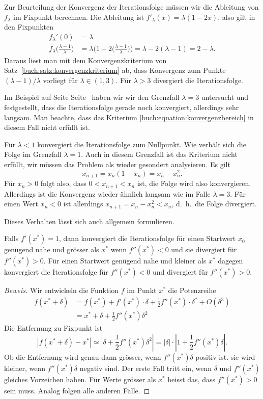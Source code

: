 Zur Beurteilung der Konvergenz der Iterationsfolge müssen wir die Ableitung
von $f_\lambda$ im Fixpunkt berechnen.
Die Ableitung ist $f'_\lambda(x)=\lambda (1-2x)$, also gilt in den Fixpunkten
\begin{align*}
f_\lambda'(0)
&=
\lambda
\\
f_\lambda\biggl(\frac{\lambda-1}{\lambda}\biggr)
&=
\lambda\biggl( 1-2
\biggl(\frac{\lambda-1}{\lambda}\biggr)\biggr)
=
\lambda-2(\lambda-1)
=
2-\lambda.
\end{align*}
Daraus liest man mit dem Konvergenzkriterium von
Satz~\ref{buch:satz:konvergenzkriterium} ab, dass Konvergenz zum Punkte
$(\lambda-1)/\lambda$ vorliegt für $\lambda \in (1,3)$.
Für $\lambda>3$ divergiert die Iterationsfolge.

Im Beispiel auf Seite Seite~\pageref{buch:beispiel:logistisch3} haben wir
wir den Grenzfall $\lambda=3$ untersucht und festgestellt, dass die
Iterationsfolge gerade noch konvergiert, allerdings sehr langsam.
Man beachte, dass das Kriterium \eqref{buch:equation:konvergenzbereich}
in diesem Fall nicht erfüllt ist.

Für $\lambda<1$ konvergiert die Iterationsfolge zum Nullpunkt.
Wie verhält sich die Folge im Grenzfall $\lambda=1$.
Auch in diesem Grenzfall ist das Kriterium nicht erfüllt, wir müssen
das Problem als wieder gesondert analysieren.
Es gilt
\[
x_{n+1} = x_n(1-x_n) = x_n-x_n^2.
\]
Für $x_n>0$ folgt also, dass $0<x_{n+1} < x_n$ ist, die Folge wird also
konvergieren.
Allerdings ist die Konvergenz wieder ähnlich langsam wie im Falle
$\lambda=3$.
Für einen Wert $x_n<0$ ist allerdings $x_{n+1} = x_n - x_n^2 < x_n$,
d.~h.~die Folge divergiert.

Dieses Verhalten lässt sich auch allgemein formulieren.

\begin{satz}
\label{buch:satz:kritischekonvergenz}
Falls $f'(x^*)=1$, dann konvergiert die Iterationsfolge für einen
Startwert $x_0$ genügend nahe und grösser als $x^*$ wenn $f''(x^*)<0$ 
und sie divergiert für $f''(x^*)>0$.
Für einen Startwert genügend nahe und kleiner als $x^*$ dagegen
konvergiert die Iterationsfolge für $f''(x^*)<0$ und divergiert für
$f''(x^*)>0$.
\end{satz}

\begin{proof}[Beweis]
Wir entwickeln die Funktion $f$ im Punkt $x^*$ die Potenzreihe
\begin{align*}
f(x^*+\delta)
&=
f(x^*) + f'(x^*)\cdot\delta + \frac12f''(x^*)\cdot \delta^* + O(\delta^3)
\\
&=
x^* + \delta + \frac12f''(x^*)\delta^2
\end{align*}
Die Entfernung zu Fixpunkt ist
\[
|f(x^*+\delta)-x^*|
\simeq
|\delta  + \frac12f''(x^*)\delta^2|
=
|\delta|\cdot |1 + \frac12f''(x^*)\delta|.
\]
Ob die Entfernung wird genau dann grösser, wenn $f''(x^*)\delta$ positiv ist.
sie wird kleiner, wenn $f''(x^*)\delta$ negativ sind.
Der erste Fall tritt ein, wenn $\delta$ und $f''(x^*)$ gleiches
Vorzeichen haben.
Für Werte grösser als $x^*$ heisst das, dass $f''(x^*)>0$ sein muss.
Analog folgen alle anderen Fälle.
\end{proof}


